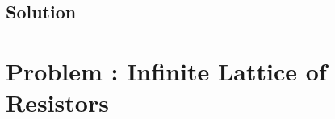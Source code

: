 \documentclass[solutions]{esg8022pset}
\renewcommand{\d}{\,d}
\begin{document}
\subsection{Solution}

\section{Problem \thesection: Infinite Lattice of Resistors}
\end{document}
